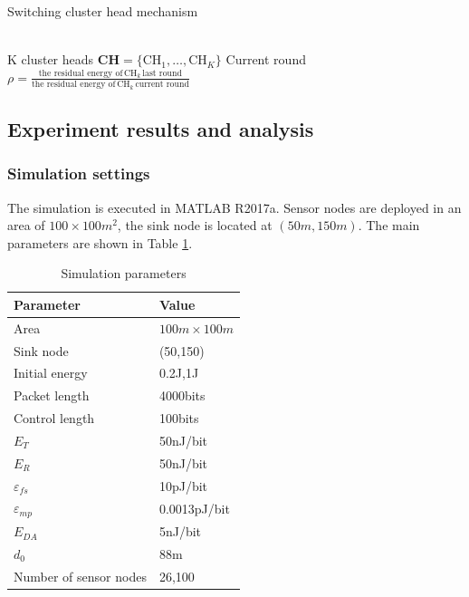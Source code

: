 \documentclass[11pt]{report}
\newcommand{\mb}{\mathbf}
\begin{document}
	\begin{algorithm}[H]
		\caption{Switching cluster head mechanism}
		\LinesNumbered %
		\KwIn
		{\\K cluster heads $\mb{CH} = \{\text{CH}_1,\dots,\text{CH}_K \}$}
		Current round\\
		{$\rho = \frac{\text{the residual energy of}\,  \text{CH}_k \,\text{last round}}{\text{the residual energy of}\,  \text{CH}_k \,\text{current round}}$\\
		{
		    }}
	\end{algorithm}
	
    \subsection{Experiment results and analysis}
    \subsubsection{Simulation settings}
	The simulation is executed in MATLAB R2017a. Sensor nodes are deployed in an area of $100 \times 100 m^2$, the sink node is located at $(50m,150m)$. The main parameters are shown in Table \ref{table1}. 

	\begin{table}[h!]
		\centering
		\caption{Simulation parameters}
		
		\label{table1}  
		\begin{tabular}{p{4cm}p{3cm}}
			\toprule[1.5pt]
			\textbf{Parameter} & \textbf{Value}\\
			\hline
			Area & $100m \times 100m$  \\
			\hline
			Sink node & (50,150)\\
			\hline
			Initial energy & 0.2J,1J\\
			\hline
			Packet length & 4000bits\\
			\hline
			Control length & 100bits\\
			\hline
			$E_T$ & 50nJ/bit \\
			\hline
			$E_R$ & 50nJ/bit \\
			\hline
			$\varepsilon_{fs}$ & 10pJ/bit\\
			\hline
			$\varepsilon_{mp}$ & 0.0013pJ/bit\\
			\hline
			$E_{DA}$ & 5nJ/bit\\
			\hline
			$d_0$ & 88m\\
			\hline
			Number of sensor nodes & 26,100\\
			\bottomrule[1.5pt]
		\end{tabular}
	\end{table}
\end{document}
